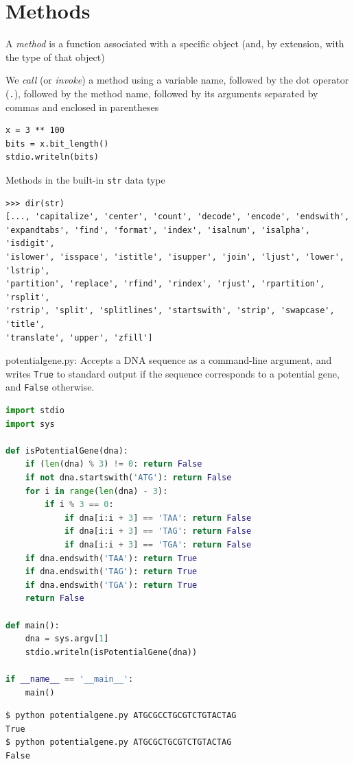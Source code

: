 \documentclass[8pt,a4paper,compress]{beamer}
\begin{document}
\section{Methods}
\begin{frame}[fragile]
A \emph{method} is a function associated with a specific object (and, by extension, with the type of that object)

\bigskip

We \emph{call} (or \emph{invoke}) a method using a variable name, followed by the dot operator (\lstinline{.}), followed by the method name, followed by its arguments separated by commas and enclosed in parentheses

\begin{lstlisting}[language={}]
x = 3 ** 100
bits = x.bit_length()
stdio.writeln(bits)
\end{lstlisting}

\bigskip

Methods in the built-in \lstinline{str} data type
\begin{lstlisting}[language={}]
>>> dir(str)
[..., 'capitalize', 'center', 'count', 'decode', 'encode', 'endswith', 
'expandtabs', 'find', 'format', 'index', 'isalnum', 'isalpha', 'isdigit', 
'islower', 'isspace', 'istitle', 'isupper', 'join', 'ljust', 'lower', 'lstrip', 
'partition', 'replace', 'rfind', 'rindex', 'rjust', 'rpartition', 'rsplit', 
'rstrip', 'split', 'splitlines', 'startswith', 'strip', 'swapcase', 'title', 
'translate', 'upper', 'zfill']
\end{lstlisting}
\end{frame}

\begin{frame}[fragile]
\begin{framed}
\tiny potentialgene.py: Accepts a DNA sequence as a command-line argument, and writes \lstinline{True} to standard output if the sequence corresponds to a potential gene, and \lstinline{False} otherwise.
\end{framed}

\begin{lstlisting}[language=Python]
import stdio
import sys

def isPotentialGene(dna):
    if (len(dna) % 3) != 0: return False
    if not dna.startswith('ATG'): return False
    for i in range(len(dna) - 3):
        if i % 3 == 0:
            if dna[i:i + 3] == 'TAA': return False
            if dna[i:i + 3] == 'TAG': return False
            if dna[i:i + 3] == 'TGA': return False
    if dna.endswith('TAA'): return True
    if dna.endswith('TAG'): return True
    if dna.endswith('TGA'): return True
    return False

def main():
    dna = sys.argv[1]
    stdio.writeln(isPotentialGene(dna))

if __name__ == '__main__':
    main()
\end{lstlisting}

\begin{lstlisting}[language={}]
$ python potentialgene.py ATGCGCCTGCGTCTGTACTAG
True
$ python potentialgene.py ATGCGCTGCGTCTGTACTAG
False
\end{lstlisting}
\end{frame}
\end{document}
